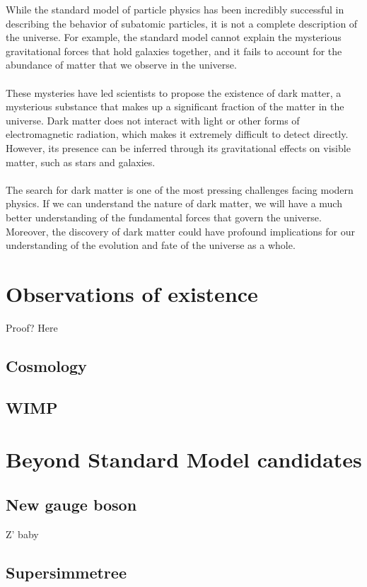 \documentclass[12pt, a4paper]{book}
\begin{document}
While the standard model of particle physics has been incredibly successful in describing the behavior of subatomic particles, it is not a complete description of the universe. For example, the standard model cannot explain the mysterious gravitational forces that hold galaxies together, 
and it fails to account for the abundance of matter that we observe in the universe.\\
\\These mysteries have led scientists to propose the existence of dark matter, a mysterious substance that makes up a significant fraction of the matter in the universe. Dark matter does not interact with light or other forms of electromagnetic radiation, which makes it extremely difficult 
to detect directly. However, its presence can be inferred through its gravitational effects on visible matter, such as stars and galaxies.\\
\\The search for dark matter is one of the most pressing challenges facing modern physics. If we can understand the nature of dark matter, we will have a much better understanding of the fundamental forces that govern the universe. Moreover, the discovery of dark matter could have profound 
implications for our understanding of the evolution and fate of the universe as a whole.

\section{Observations of existence}
Proof? Here \cite{DM1, DM2}
\subsection{Cosmology}
\subsection{WIMP}

\section{Beyond Standard Model candidates}
\subsection{New gauge boson}
Z' baby \cite{Zp_DM_candidate1, Zp_DM_candidate2, Zp_DM_candidate3}
\subsection{Supersimmetree}
\end{document}
